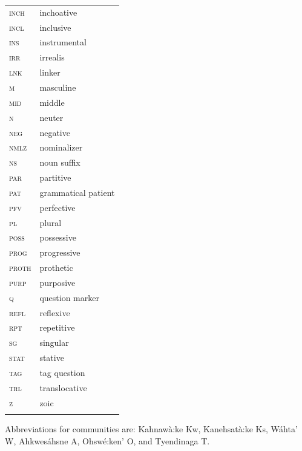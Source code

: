 \documentclass[output=paper,colorlinks,citecolor=brown]{langscibook}
\begin{document}
\begin{tabularx}{.45\textwidth}{lQ}
\scshape inch & inchoative \\
\scshape incl & inclusive \\
\scshape ins & instrumental \\
\scshape irr & irrealis \\
\scshape lnk & linker \\
\scshape m & masculine \\
\scshape mid & middle \\
\scshape n & neuter \\
\scshape neg & negative \\
\scshape nmlz & nominalizer \\
\scshape ns & noun suffix \\
\scshape par & partitive \\
\scshape pat & grammatical patient \\
\scshape pfv & perfective \\
\scshape pl & plural \\
\scshape poss & possessive \\
\scshape prog & progressive \\
\scshape proth & prothetic \\
\scshape purp & purposive \\
\scshape q & question marker \\
\scshape refl & reflexive \\
\scshape rpt & repetitive \\
\scshape sg & singular \\
\scshape stat & stative \\
\scshape tag & tag question \\
\scshape trl & translocative \\
\scshape z & zoic \\
& \\
\end{tabularx}\medskip

 \noindent
Abbreviations for communities are: Kahnawà:ke Kw, Kanehsatà:ke Ks, Wáhta’ W, Ahkwesáhsne A, Ohswé:ken’ O, and Tyendinaga T.


\sloppy\printbibliography[heading=subbibliography,notkeyword=this]
\end{document}
